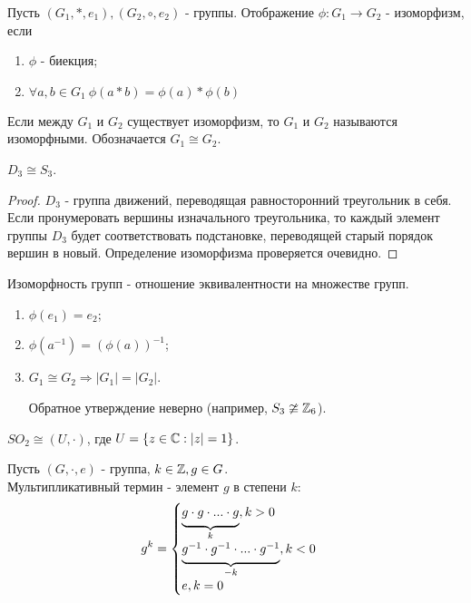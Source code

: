 \begin{definition}
    Пусть $(G_1, *, e_1), (G_2, \circ ,e_2)$ - группы. Отображение $\phi: G_1 \rightarrow G_2$ - изоморфизм, если
    \begin{enumerate}
        \item $\phi$ - биекция;
        \item $\forall a, b \in G_1 \ \phi(a * b) = \phi(a) * \phi(b)$
    \end{enumerate}
    Если между $G_1$ и $G_2$ существует изоморфизм, то $G_1$ и $G_2$ называются изоморфными. Обозначается $G_1 \cong  G_2$.
\end{definition}
\begin{example}
    $D_3 \cong S_3$.
\end{example}
\begin{proof}
    $D_3$ - группа движений, переводящая равносторонний треугольник в себя. Если пронумеровать вершины изначального треугольника, то каждый элемент группы $D_3$ будет соответствовать подстановке, переводящей старый порядок вершин в новый. Определение изоморфизма проверяется очевидно.
\end{proof}
\begin{subtheorem}
    Изоморфность групп - отношение эквивалентности на множестве групп.
\end{subtheorem}
\begin{subtheorem} \tab
    \begin{enumerate}
        \item $\phi(e_1) = e_2$;
        \item $\phi(a^{-1}) = (\phi(a))^{-1}$;
        \item $G_1 \cong  G_2 \Longrightarrow |G_1| = |G_2|$.
        \begin{remark}
            Обратное утверждение неверно (например, $S_3 \ncong \mathbb{Z}_6$).
        \end{remark}
    \end{enumerate}
\end{subtheorem}
\begin{example}
    $SO_2 \cong (U, \cdot)$, где $U = \{z \in \mathbb{C} : |z| = 1\}$.
\end{example}
\begin{definition}
    Пусть $(G, \cdot, e)$ - группа, $k \in \mathbb{Z}, g \in G$.\\
    Мультипликативный термин - элемент $g$ в степени $k$:
    $$g^k =
    \begin{cases} \undermat{k}{g \cdot g \cdot ... \cdot g}, k > 0 \\
        \\
        \undermat{-k}{g^{-1} \cdot g^{-1} \cdot ... \cdot g^{-1}}, k < 0 \\
        \\
        e, k = 0
    \end{cases}$$
\end{definition}
